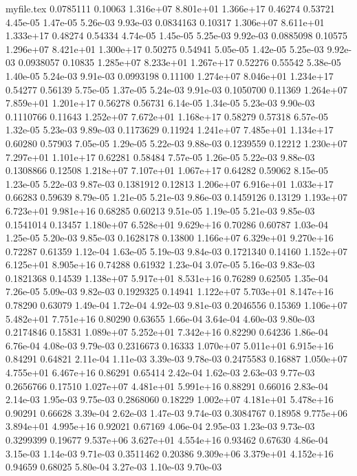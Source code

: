 \begin{filecontents}{myfile.tex}
0.0785111 0.10063 1.316e+07 8.801e+01 1.366e+17 0.46274 0.53721 4.45e-05 1.47e-05 5.26e-03 9.93e-03
0.0834163 0.10317 1.306e+07 8.611e+01 1.333e+17 0.48274 0.54334 4.74e-05 1.45e-05 5.25e-03 9.92e-03
0.0885098 0.10575 1.296e+07 8.421e+01 1.300e+17 0.50275 0.54941 5.05e-05 1.42e-05 5.25e-03 9.92e-03
0.0938057 0.10835 1.285e+07 8.233e+01 1.267e+17 0.52276 0.55542 5.38e-05 1.40e-05 5.24e-03 9.91e-03
0.0993198 0.11100 1.274e+07 8.046e+01 1.234e+17 0.54277 0.56139 5.75e-05 1.37e-05 5.24e-03 9.91e-03
0.1050700 0.11369 1.264e+07 7.859e+01 1.201e+17 0.56278 0.56731 6.14e-05 1.34e-05 5.23e-03 9.90e-03
0.1110766 0.11643 1.252e+07 7.672e+01 1.168e+17 0.58279 0.57318 6.57e-05 1.32e-05 5.23e-03 9.89e-03
0.1173629 0.11924 1.241e+07 7.485e+01 1.134e+17 0.60280 0.57903 7.05e-05 1.29e-05 5.22e-03 9.88e-03
0.1239559 0.12212 1.230e+07 7.297e+01 1.101e+17 0.62281 0.58484 7.57e-05 1.26e-05 5.22e-03 9.88e-03
0.1308866 0.12508 1.218e+07 7.107e+01 1.067e+17 0.64282 0.59062 8.15e-05 1.23e-05 5.22e-03 9.87e-03
0.1381912 0.12813 1.206e+07 6.916e+01 1.033e+17 0.66283 0.59639 8.79e-05 1.21e-05 5.21e-03 9.86e-03
0.1459126 0.13129 1.193e+07 6.723e+01 9.981e+16 0.68285 0.60213 9.51e-05 1.19e-05 5.21e-03 9.85e-03
0.1541014 0.13457 1.180e+07 6.528e+01 9.629e+16 0.70286 0.60787 1.03e-04 1.25e-05 5.20e-03 9.85e-03
0.1628178 0.13800 1.166e+07 6.329e+01 9.270e+16 0.72287 0.61359 1.12e-04 1.63e-05 5.19e-03 9.84e-03
0.1721340 0.14160 1.152e+07 6.125e+01 8.905e+16 0.74288 0.61932 1.23e-04 3.07e-05 5.16e-03 9.83e-03
0.1821368 0.14539 1.138e+07 5.917e+01 8.531e+16 0.76289 0.62505 1.35e-04 7.26e-05 5.09e-03 9.82e-03
0.1929325 0.14941 1.122e+07 5.703e+01 8.147e+16 0.78290 0.63079 1.49e-04 1.72e-04 4.92e-03 9.81e-03
0.2046556 0.15369 1.106e+07 5.482e+01 7.751e+16 0.80290 0.63655 1.66e-04 3.64e-04 4.60e-03 9.80e-03
0.2174846 0.15831 1.089e+07 5.252e+01 7.342e+16 0.82290 0.64236 1.86e-04 6.76e-04 4.08e-03 9.79e-03
0.2316673 0.16333 1.070e+07 5.011e+01 6.915e+16 0.84291 0.64821 2.11e-04 1.11e-03 3.39e-03 9.78e-03
0.2475583 0.16887 1.050e+07 4.755e+01 6.467e+16 0.86291 0.65414 2.42e-04 1.62e-03 2.63e-03 9.77e-03
0.2656766 0.17510 1.027e+07 4.481e+01 5.991e+16 0.88291 0.66016 2.83e-04 2.14e-03 1.95e-03 9.75e-03
0.2868060 0.18229 1.002e+07 4.181e+01 5.478e+16 0.90291 0.66628 3.39e-04 2.62e-03 1.47e-03 9.74e-03
0.3084767 0.18958 9.775e+06 3.894e+01 4.995e+16 0.92021 0.67169 4.06e-04 2.95e-03 1.23e-03 9.73e-03
0.3299399 0.19677 9.537e+06 3.627e+01 4.554e+16 0.93462 0.67630 4.86e-04 3.15e-03 1.14e-03 9.71e-03
0.3511462 0.20386 9.309e+06 3.379e+01 4.152e+16 0.94659 0.68025 5.80e-04 3.27e-03 1.10e-03 9.70e-03

\end{filecontents}
